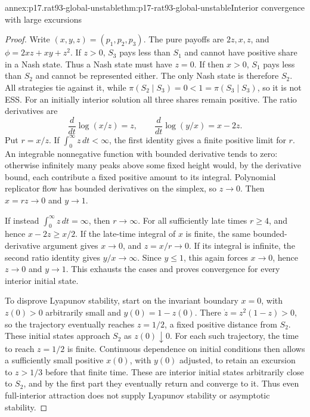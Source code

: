 \begin{annexitem}{annex:p17.rat93-global-unstable}{thm:p17-rat93-global-unstable}{Interior convergence with large excursions}
\begin{proof}
Write \((x,y,z)=(p_1,p_2,p_3)\). The pure payoffs are
\(2z,x,z\), and \(\phi=2xz+xy+z^2\).
If \(z>0\), \(S_3\) pays less than \(S_1\) and cannot have positive
share in a Nash state. Thus a Nash state must have \(z=0\). If then
\(x>0\), \(S_1\) pays less than \(S_2\) and cannot be represented
either. The only Nash state is therefore \(S_2\). All strategies tie
against it, while \(\pi(S_2\mid S_3)=0<1=\pi(S_3\mid S_3)\),
so it is not ESS.
For an initially interior solution all three shares remain positive.
The ratio derivatives are
\[
 \frac{d}{dt}\log(x/z)=z,\qquad
 \frac{d}{dt}\log(y/x)=x-2z.
\]
Put \(r=x/z\). If \(\int_0^\infty z\,dt<\infty\), the first
identity gives a finite positive limit for \(r\). An integrable
nonnegative function with bounded derivative tends to zero: otherwise
infinitely many peaks above some fixed height would, by the derivative
bound, each contribute a fixed positive amount to its integral.
Polynomial replicator flow has bounded derivatives on the simplex,
so \(z\to0\). Then \(x=rz\to0\) and \(y\to1\).

If instead \(\int_0^\infty z\,dt=\infty\), then \(r\to\infty\).
For all sufficiently late times \(r\geq4\), and hence
\(x-2z\geq x/2\). If the late-time integral of \(x\) is finite,
the same bounded-derivative argument gives \(x\to0\), and
\(z=x/r\to0\). If its integral is infinite, the second ratio
identity gives \(y/x\to\infty\). Since \(y\leq1\), this again
forces \(x\to0\), hence \(z\to0\) and \(y\to1\).
This exhausts the cases and proves convergence for every interior
initial state.

To disprove Lyapunov stability, start on the invariant boundary
\(x=0\), with \(z(0)>0\) arbitrarily small and
\(y(0)=1-z(0)\). There
\(\dot z=z^2(1-z)>0\), so the trajectory eventually reaches
\(z=1/2\), a fixed positive distance from \(S_2\).
These initial states approach \(S_2\) as \(z(0)\downarrow0\).
For each such trajectory, the time to reach \(z=1/2\) is finite.
Continuous dependence on initial conditions then allows a sufficiently
small positive \(x(0)\), with \(y(0)\) adjusted, to retain an
excursion to \(z>1/3\) before that finite time. These are interior
initial states arbitrarily close to \(S_2\), and by the first part
they eventually return and converge to it. Thus even full-interior
attraction does not supply Lyapunov stability or asymptotic stability.
\end{proof}
\end{annexitem}
